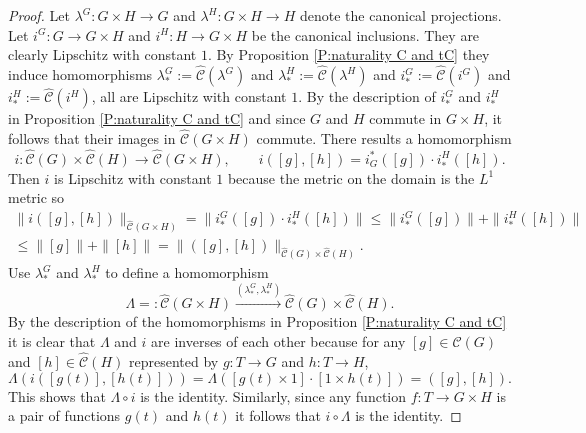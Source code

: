 \documentclass[12pt]{amsart}
\theoremstyle{definition}
\newcommand{\xto}[1]{\xrightarrow{#1}}
\def\tC{\hat{\mathcal{C}}}
\begin{document}
\begin{proof}
Let $\lambda^G \colon G \times H \to G$ and $\lambda^H \colon G \times H \to H$ denote the canonical projections.
Let $i^G \colon G \to G \times H$ and $i^H \colon H \to G \times H$ be the canonical inclusions.
They are clearly Lipschitz with constant $1$.
By Proposition \ref{P:naturality C and tC} they induce homomorphisms  $\lambda^G_*:=\tC(\lambda^G)$ and $\lambda^H_*:=\tC(\lambda^H)$ and $i^G_*:=\tC(i^G)$ and $i^H_*:=\tC(i^H)$, all are Lipschitz with constant $1$.
By the description of $i^G_*$ and $i^H_*$ in Proposition \ref{P:naturality C and tC} and since $G$ and $H$ commute in $G \times H$, it follows that their images in $\tC(G \times H)$ commute.
There results a homomorphism
\[
i \colon \tC(G) \times \tC(H) \to \tC(G \times H), \qquad
i([g],[h]) = i_G^*([g]) \cdot i^H_*([h]).
\]
Then $i$ is Lipschitz with constant $1$ because the metric on the domain is the $L^1$ metric so
\begin{multline*}
\|i([g],[h])\|_{\tC(G \times H)} = \|i^G_*([g]) \cdot i^H_*([h])\| \leq \|i^G_*([g])\|+\|i^H_*([h])\| 
 \\
\leq \|[g]\|+\|[h]\|= \|([g],[h])\|_{\tC(G) \times \tC(H)}.
\end{multline*}
Use $\lambda^G_*$ and $\lambda^H_*$ to define a homomorphism
\[
\Lambda= \colon \tC(G \times H) \xto{(\lambda^G_*,\lambda^H_*)} \tC(G) \times \tC(H).
\]
By the description of the homomorphisms in Proposition \ref{P:naturality C and tC} it is clear that $\Lambda$ and $i$ are inverses of each other because for any $[g] \in \tC(G)$ and $[h] \in \tC(H)$ represented by $g \colon T \to G$ and $h \colon T \to H$,
\[
\Lambda(i([g(t)],[h(t)])) = \Lambda([g(t)\times 1] \cdot [1 \times h(t)]) = ([g],[h]).
\]
This shows that $\Lambda \circ i$ is the identity.
Similarly, since any function $f \colon T \to G \times H$ is a pair of functions $g(t)$ and $h(t)$ it follows that $i \circ \Lambda$ is the identity.


\end{proof}
\end{document}
